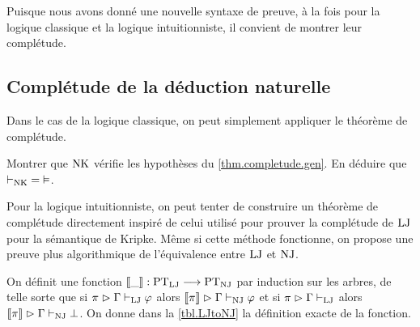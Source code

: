 Puisque nous avons donné une nouvelle syntaxe de preuve, à la fois pour la
logique classique et la logique intuitionniste, il convient de montrer leur
complétude.

\subsection{Complétude de la déduction naturelle}

Dans le cas de la logique classique, on peut simplement appliquer le théorème de
complétude.

\begin{exercise}
  Montrer que $\operatorname{NK}$ vérifie les hypothèses du \cref{thm.completude.gen}. En
  déduire que $\mathord{\vdash_{\operatorname{NK}}} = \mathord{\vDash}$.
\end{exercise}

Pour la logique intuitionniste, on peut tenter de construire un théorème de
complétude directement inspiré de celui utilisé pour prouver la complétude de
$\operatorname{LJ}$ pour la sémantique de Kripke. Même si cette méthode fonctionne, on propose
une preuve plus algorithmique de l'équivalence entre $\operatorname{LJ}$ et $\operatorname{NJ}$.

\begin{definition}
  \label{def.LJtoNJ}
  On définit une fonction $\llbracket \mathord{\_} \rrbracket : \displaystyle \operatorname{PT}_{\operatorname{LJ}} \longrightarrow \operatorname{PT}_{\operatorname{NJ}}$ par
  induction sur les arbres, de telle sorte que si
  $\pi\mathrel{\rhd} \Gamma\vdash_{\operatorname{LJ}} \varphi$ alors
  $\llbracket \pi \rrbracket\mathrel{\rhd}\Gamma\vdash_{\operatorname{NJ}}\varphi$ et si $\pi\mathrel{\rhd}\Gamma\vdash_{\operatorname{LJ}}$ alors
  $\llbracket \pi \rrbracket\mathrel{\rhd}\Gamma\vdash_{\operatorname{NJ}}\bot$. On donne dans la \cref{tbl.LJtoNJ} la
  définition exacte de la fonction.
\end{definition}

